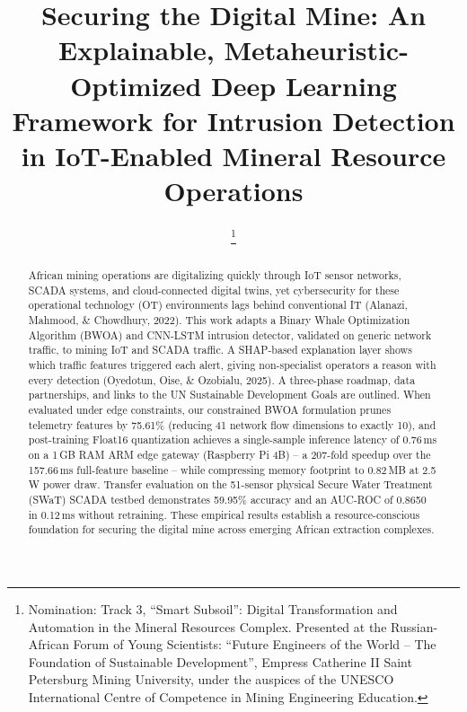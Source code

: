 \documentclass[conference]{IEEEtran}
\begin{document}
\title{Securing the Digital Mine: An Explainable, Metaheuristic-Optimized Deep Learning Framework for Intrusion Detection in IoT-Enabled Mineral Resource Operations}

\author{
\thanks{Nomination: Track 3, ``Smart Subsoil'': Digital Transformation and Automation in the Mineral Resources Complex. Presented at the Russian-African Forum of Young Scientists: ``Future Engineers of the World -- The Foundation of Sustainable Development'', Empress Catherine II Saint Petersburg Mining University, under the auspices of the UNESCO International Centre of Competence in Mining Engineering Education.}
}

\maketitle

\begin{abstract}
African mining operations are digitalizing quickly through IoT sensor networks, SCADA systems, and cloud-connected digital twins, yet cybersecurity for these operational technology (OT) environments lags behind conventional IT (Alanazi, Mahmood, \& Chowdhury, 2022). This work adapts a Binary Whale Optimization Algorithm (BWOA) and CNN-LSTM intrusion detector, validated on generic network traffic, to mining IoT and SCADA traffic. A SHAP-based explanation layer shows which traffic features triggered each alert, giving non-specialist operators a reason with every detection (Oyedotun, Oise, \& Ozobialu, 2025). A three-phase roadmap, data partnerships, and links to the UN Sustainable Development Goals are outlined. When evaluated under edge constraints, our constrained BWOA formulation prunes telemetry features by 75.61\% (reducing 41 network flow dimensions to exactly 10), and post-training Float16 quantization achieves a single-sample inference latency of 0.76\,ms on a 1\,GB RAM ARM edge gateway (Raspberry Pi 4B) -- a 207-fold speedup over the 157.66\,ms full-feature baseline -- while compressing memory footprint to 0.82\,MB at 2.5\,W power draw. Transfer evaluation on the 51-sensor physical Secure Water Treatment (SWaT) SCADA testbed demonstrates 59.95\% accuracy and an AUC-ROC of 0.8650 in 0.12\,ms without retraining. These empirical results establish a resource-conscious foundation for securing the digital mine across emerging African extraction complexes.
\end{abstract}
\end{document}

